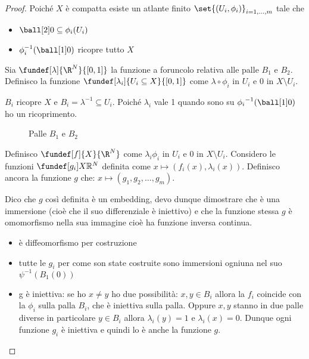 \begin{proof}
 Poiché $X$ è compatta esiste un atlante finito $\set{(U_i, \phi_i)}_{i = 1, ..., m}$ tale che 
 \begin{itemize}
  \item $\ball[2]0 \subseteq {\phi}_{i}(U_{i})$
  \item ${\phi_{i}^{-1}(\ball[1]0)}$ ricopre tutto $X$
  \end{itemize}
 Sia $\fundef[\lambda]{\R^N}{[0, 1]}$ la funzione a foruncolo relativa alle palle $B_{1}$ e $B_{2}$. Definisco la funzione $\fundef[\lambda_i]{U_i\subseteq X}{[0,1]}$
 come $\lambda \circ \phi_{i}$ in $U_{i}$ e $0$ in $X \setminus U_{i}$.
 
 ${B_{i}}$ ricopre $X$ e $B_{i} = {\lambda}^{-1} \subseteq U_{i}$. Poiché $\lambda_i$ vale 1 quando sono su ${\phi_{i}}^{-1} (\ball[1]0)$ ho un ricoprimento.


\begin{figure}
    \centering %
    
    \caption{Palle $B_{1}$ e $B_{2}$}
\end{figure}
 
 Definisco $\fundef[f]{X}{\R^N}$ come $\lambda_{i}  \phi_{i}$ in $U_{i}$ e $0$ in $X \setminus U_{i}$. Considero le funzioni $\fundef[g_{i}]{X}{\mathbb{R}^{N}}$
 definita come $x \mapsto (f_{i}(x), \lambda_{i}(x))$. Definisco ancora la funzione $g$ che: $x \mapsto (g_1, g_2, \dots, g_m)$.
 
 
 Dico che $g$ così definita è un embedding, devo dunque dimostrare che è una immersione (cioè che il suo differenziale è iniettivo) e che la funzione stessa $g$ è omomorfismo nella sua immagine
 cioè ha funzione inversa continua.
 
 \begin {itemize}
  \item è diffeomorfismo per costruzione
  \item tutte le $g_{i}$ per come son state costruite sono immersioni ogniuna nel suo $\psi^{-1}(B_1(0))$
  \item g è iniettiva: se ho $x \neq y$  ho due possibilità: $x, y \in B_{i}$ allora la $f_i$ coincide con la $\phi_i$ sulla palla $B_{i}$, che è iniettiva sulla palla. 
  Oppure $x, y$ stanno in due palle diverse in particolare $y \in B_{i}$ allora $\lambda_{i}(y) = 1$ e $\lambda_{i}(x) = 0$. Dunque ogni funzione $g_i$ è iniettiva e quindi lo è anche la funzione
  $g$.
  \qedhere
 \end {itemize}
\end{proof}


